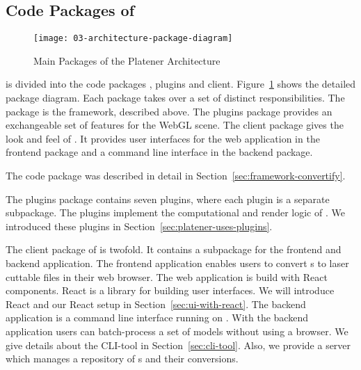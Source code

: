 \documentclass[../../ClassicThesis.tex]{subfiles}
\begin{document}


\subsection{Code Packages of {\platener}}
\label{sec:code-packages-platener}





\begin{figure}
  \centering
  \texttt{[image: 03-architecture-package-diagram]}
  \caption{Main Packages of the Platener Architecture}
  \label{fig:package-diagram}
\end{figure}

{\platener} is divided into the code packages {\convertify},
plugins and client. Figure~\ref{fig:package-diagram}
shows the detailed package diagram. Each package takes over a set of distinct
responsibilities. The {\convertify} package is the framework,
described above. The plugins package provides an exchangeable
set of features for the WebGL scene. The client package gives
the look and feel of {\platener}. It provides user interfaces for the
web application in the frontend package and a command line interface
in the backend package.

The {\convertify} code package was described in detail in
Section~\ref{sec:framework-convertify}.

The plugins package contains seven plugins, where each plugin is a
separate subpackage. The plugins implement the computational and
render logic of {\platener}. We introduced these plugins in
Section~\ref{sec:platener-uses-plugins}.


The client package of {\platener} is twofold. It contains a
subpackage for the frontend and backend application. The
frontend application enables users to convert
{\threedmodel}s to laser cuttable files in their web
browser. The web application is build with React components.
React is a {\javascript} library for building user
interfaces. We will introduce React and our React setup in
Section~\ref{sec:ui-with-react}. The backend application is
a command line interface running on {\nodejs}. With the
backend application users can batch-process a set of models
without using a browser. We give details about the CLI-tool
in Section~\ref{sec:cli-tool}. Also, we provide a server
which manages a repository of {\threedmodel}s and their
conversions.
\end{document}
